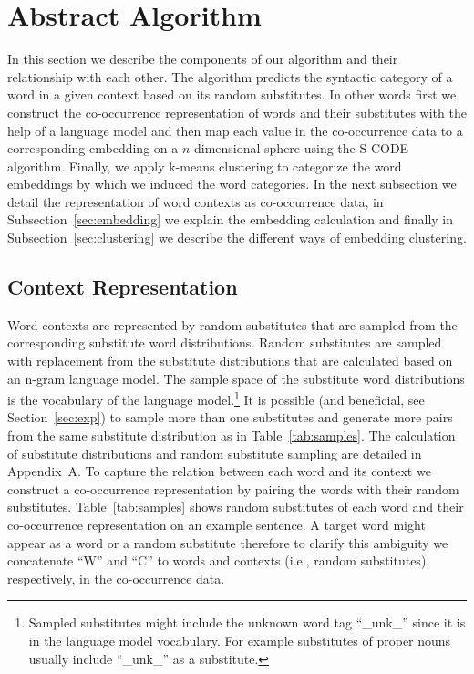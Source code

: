 \section{Abstract Algorithm}

In this section we describe the components of our algorithm and their
relationship with each other.  The algorithm predicts the syntactic
category of a word in a given context based on its random substitutes.
In other words first we construct the co-occurrence representation of
words and their substitutes with the help of a language model and then
map each value in the co-occurrence data to a corresponding embedding
on a $n$-dimensional sphere using the S-CODE algorithm.  Finally, we
apply k-means clustering to categorize the word embeddings by which we
induced the word categories.  In the next subsection we detail the
representation of word contexts as co-occurrence data, in
Subsection~\ref{sec:embedding} we explain the embedding calculation
and finally in Subsection~\ref{sec:clustering} we describe the
different ways of embedding clustering.

\subsection{Context Representation}
\label{sec:cooc}

Word contexts are represented by random substitutes that are sampled
from the corresponding substitute word distributions.  Random
substitutes are sampled with replacement from the substitute
distributions that are calculated based on an n-gram language model.
The sample space of the substitute word distributions is the
vocabulary of the language model.\footnote{Sampled substitutes might
  include the unknown word tag ``\_unk\_'' since it is in the language
  model vocabulary.  For example substitutes of proper nouns usually
  include ``\_unk\_'' as a substitute.}  It is possible (and
beneficial, see Section~\ref{sec:exp}) to sample more than one
substitutes and generate more pairs from the same substitute
distribution as in Table~\ref{tab:samples}.  The calculation of
substitute distributions and random substitute sampling are detailed
in Appendix~A.  To capture the relation between each word and its
context we construct a co-occurrence representation by pairing the
words with their random substitutes.  Table~\ref{tab:samples} shows
random substitutes of each word and their co-occurrence representation
on an example sentence.  A target word might appear as a word or a
random substitute therefore to clarify this ambiguity we concatenate
``W'' and ``C'' to words and contexts (i.e., random substitutes),
respectively, in the co-occurrence data.

